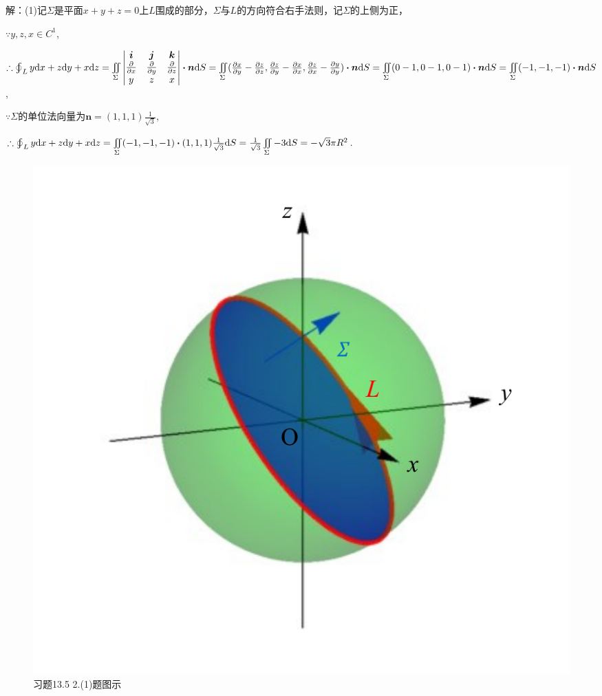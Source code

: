 \documentclass[12pt,UTF8]{ctexart}
\newcommand{\BLOInt}[2]{\varoint\nolimits_{#1}#2}
\newcommand{\md}[1]{\mathrm d#1}
\newcommand{\BSIInt}[2]{\iint\limits_{#1}#2}
\newcommand{\pp}[2]{\frac{\partial #1}{\partial #2}}
\begin{document}
\begin{enumerate}
解：(1)记$\Sigma$是平面$x+y+z=0$上$L$围成的部分，$\Sigma$与$L$的方向符合右手法则，记$\Sigma$的上侧为正，

$\because y,z,x\in C^1$,

$\therefore\BLOInt L{y\md x+z\md y+x\md z}=\BSIInt\Sigma{\begin{vmatrix}
\bm i&\bm j&\bm k\\
\frac\partial{\partial x}&\frac\partial{\partial y}&\frac\partial{\partial z}\\
y&z&x
\end{vmatrix}\bm\cdot\bm n\md S}=\BSIInt\Sigma{(\pp xy-\pp zz,\pp zy-\pp xx,\pp zx-\pp yy)\bm\cdot\bm n\md S}\\
=\BSIInt\Sigma{(0-1,0-1,0-1)\bm\cdot\bm n\md S}=\BSIInt\Sigma{(-1,-1,-1)\bm\cdot\bm n\md S}$,

$\because\Sigma$的单位法向量为$\bm n=(1,1,1)\frac1{\sqrt3}$,

$\therefore\BLOInt L{y\md x+z\md y+x\md z}=\BSIInt\Sigma{(-1,-1,-1)\bm\cdot(1,1,1)\frac1{\sqrt3}\md S}=\frac1{\sqrt3}\BSIInt\Sigma{-3\md S}=-\sqrt3\pi R^2$.

\begin{figure}[H]
\begin{center}
\includegraphics[height=0.5\textheight]{Figures24/Fig13-5-2-1.pdf}
\end{center}
\caption{习题13.5 2.(1)题图示}
\label{13-5-2-1}
\end{figure}


\end{enumerate}
\end{document}
